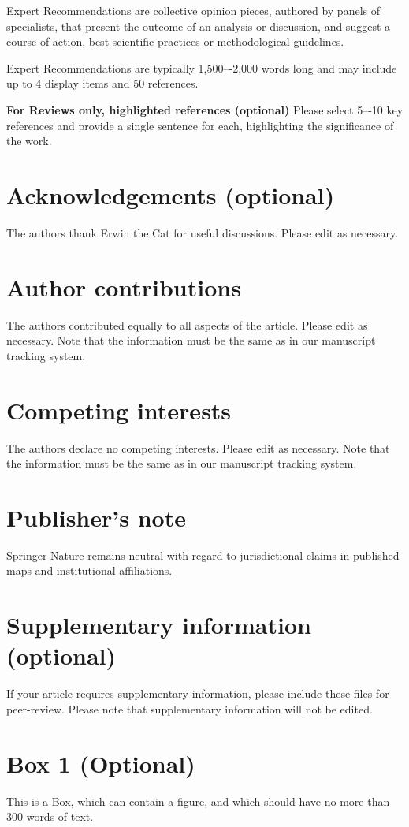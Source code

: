 \documentclass[fleqn,10pt]{wlscirep}
\begin{document}
Expert Recommendations are collective opinion pieces, authored by panels of specialists, that present the outcome of an analysis or discussion, and suggest a course of action, best scientific practices or methodological guidelines.

Expert Recommendations are typically 1,500–-2,000 words long and may include up to 4 display items and 50 references.



\noindent \textbf{For Reviews only, highlighted references (optional)} Please select 5–-10 key references and provide a single sentence for each, highlighting the significance of the work.

\section*{Acknowledgements (optional)}
The authors thank Erwin the Cat for useful discussions. Please edit as necessary.

\section*{Author contributions}
The authors contributed equally to all aspects of the article. Please edit as necessary. Note that the information must be the same as in our manuscript tracking system.

\section*{Competing interests}
The authors declare no competing interests. Please edit as necessary. Note that the information must be the same as in our manuscript tracking system.

\section*{Publisher’s note}
Springer Nature remains neutral with regard to jurisdictional claims in published maps and institutional affiliations.

\section*{Supplementary information (optional)}
If your article requires supplementary information, please include these files for peer-review. Please note that supplementary information will not be edited.

\newpage
\section*{Box 1 (Optional)}
This is a Box, which can contain a figure, and which should have no more than 300 words of text.
\end{document}
